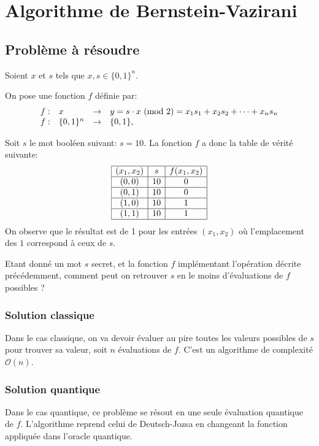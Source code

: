 \chapter{Algorithme de Bernstein-Vazirani}
\section{Problème à résoudre}

Soient $x$ et $s$ tels que $x, s \in \{0, 1\}^n$.

On pose une fonction $f$ définie par:
\[
  \begin{array}{llll}
    f :  &  x              & \to     & y = s \cdot x \ (\mathrm{mod}\ 2) = x_1 s_1 + x_2 s_2 + \dots + x_n s_n \\
    f:   &  \{0, 1\}^n     & \to     & \{0, 1\},
  \end{array}  
\]

\begin{ex}
  Soit $s$ le mot booléen suivant: $s = 10$. La fonction $f$ a donc la table de vérité suivante:
\[
  \begin{array}{|c|c|c|}
    \hline
   (x_1, x_2) & s & f(x_1,x_2) \\
    \hline
    (0,0) & 10 & 0 \\
    \hline
    (0,1) & 10 & 0 \\
    \hline
    (1,0) & 10 & 1 \\
    \hline
    (1,1) & 10 & 1 \\
    \hline
  \end{array}
\]
On observe que le résultat est de 1 pour les entrées $(x_1, x_2)$ où l'emplacement des $1$ correspond à ceux de $s$.
\end{ex}

\begin{pb}
Etant donné un mot $s$ secret, et la fonction $f$ implémentant l'opération décrite précédemment, comment peut on retrouver $s$ en le moins d'évaluations de $f$ possibles ?
\end{pb}

\subsection{Solution classique}
Dans le cas classique, on va devoir évaluer au pire toutes les valeurs possibles de $s$ pour trouver sa valeur, soit $n$ évaluations de $f$. C'est un algorithme de complexité $\mathcal{O}(n)$.

\subsection{Solution quantique}
Dans le cas quantique, ce problème se résout en une seule évaluation
quantique de $f$. L'algorithme reprend celui de Deutsch-Jozsa en changeant la fonction appliquée dans l'oracle quantique.

